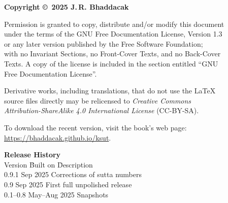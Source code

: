 \thispagestyle{empty}
{\footnotesize
\noindent\textbf{Copyright \copyright\ 2025 J.\,R. Bhaddacak}

\parskip=3mm
\noindent 
Permission is granted to copy, distribute and/or modify this document\\
under the terms of the GNU Free Documentation License, Version 1.3\\
or any later version published by the Free Software Foundation;\\
with no Invariant Sections, no Front-Cover Texts, and no Back-Cover\\
Texts.  A copy of the license is included in the section entitled ``GNU\\
Free Documentation License''.

\parskip=3mm
\noindent 
Derivative works, including translations, that do not use the \LaTeX\\
source files directly may be relicensed to \emph{Creative Commons\\
Attribution-ShareAlike 4.0 International License} (CC-BY-SA).

\parskip=3mm
\noindent 
To download the recent version, visit the book's web page:\\
\url{https://bhaddacak.github.io/ksut}.

\begin{tabbing}
\textbf{Release History}\\
Version \hspace{4mm} \= Built on \hspace{15mm} \= Description\\
0.9.1  Sep 2025 \> Corrections of sutta numbers \\
0.9  Sep 2025 \> First full unpolished release \\
0.1--0.8 \>  May--Aug 2025 \> Snapshots \\
\end{tabbing}
}
